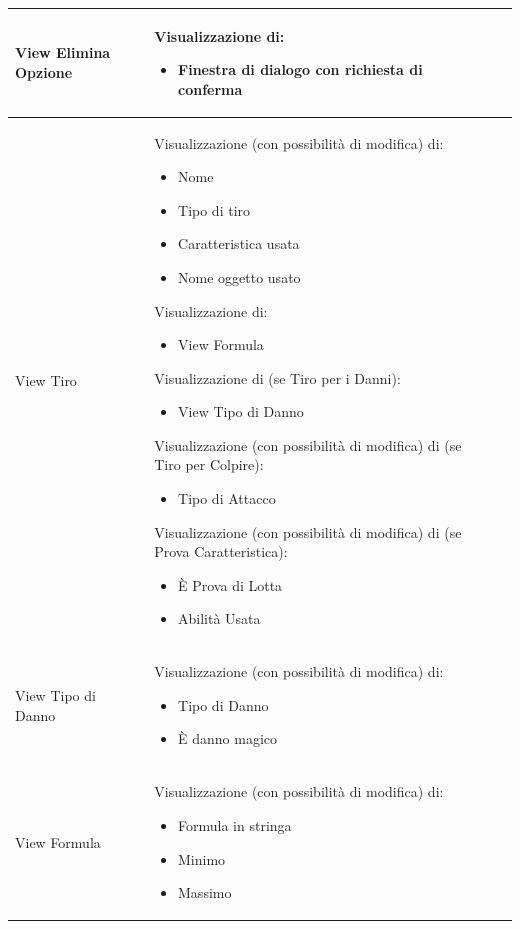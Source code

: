 \documentclass[a4paper, 11pt]{article}
\begin{document}
\begin{adjustwidth}{-1.5cm}{-1.5cm}
\begin{center}
\begin{longtable}{|p{5cm}|p{5cm}|p{5cm}|}
        View Elimina Opzione & 
        Visualizzazione di:
        \begin{itemize}
            \item Finestra di dialogo con richiesta di conferma
        \end{itemize} & 
        \\ \hline
        
        View Tiro & 
        Visualizzazione (con possibilità di modifica) di:
        \begin{itemize}
            \item Nome
            \item Tipo di tiro
            \item Caratteristica usata
            \item Nome oggetto usato
        \end{itemize}
        Visualizzazione di:
        \begin{itemize}
            \item View Formula
        \end{itemize}
        Visualizzazione di (se Tiro per i Danni):
        \begin{itemize}
            \item View Tipo di Danno
        \end{itemize}
        Visualizzazione (con possibilità di modifica) di (se Tiro per Colpire):
        \begin{itemize}
            \item Tipo di Attacco
        \end{itemize}
        Visualizzazione (con possibilità di modifica) di (se Prova Caratteristica):
        \begin{itemize}
            \item È Prova di Lotta
            \item Abilità Usata
        \end{itemize} & 
        \\ \hline
        
        View Tipo di Danno & 
        Visualizzazione (con possibilità di modifica) di:
        \begin{itemize}
            \item Tipo di Danno
            \item È danno magico
        \end{itemize} & 
        \\ \hline
        
        View Formula & 
        Visualizzazione (con possibilità di modifica) di:
        \begin{itemize}
            \item Formula in stringa
            \item Minimo
            \item Massimo
        \end{itemize} & 
        \\ \hline
        

\end{longtable}
\end{center}
\end{adjustwidth}
\end{document}
